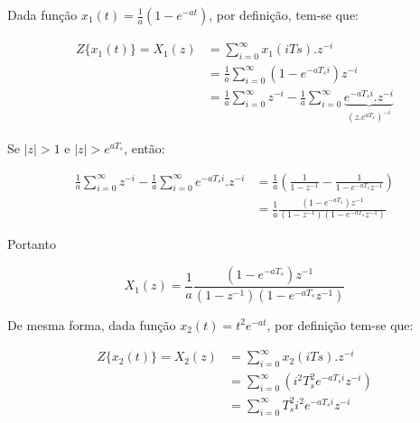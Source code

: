 \begin{enumerate}
        Dada função $x_1(t) = \frac{1}{a} \left( 1 - e^{-at} \right)$, por definição, tem-se que:
        
        	\begin{equation}
            	\begin{split}
                	Z\{x_1(t)\} = X_1(z) & = \sum_{i=0}^{\infty} x_1(i Ts).z^{-i} \\
                	& = \frac{1}{a} \sum_{i=0}^{\infty} \left( 1 - e^{-a T_s i} \right)z^{-i} \\
                	& = \frac{1}{a} \sum_{i=0}^{\infty} z^{-i} - \frac{1}{a} \sum_{i=0}^{\infty} \underbrace{e^{-a T_s i}.z^{-i}}_{(z.e^{aT_s})^{-i}}
            	\end{split}
        	\end{equation}
        
        Se $|z| > 1$ e $|z| > e^{aT_s}$, então:
        	
        	\begin{equation}
            	\begin{split}
                	\frac{1}{a} \sum_{i=0}^{\infty} z^{-i} - \frac{1}{a} \sum_{i=0}^{\infty} e^{-a T_s i}.z^{-i} & = \frac{1}{a} (\frac{1}{1-z^ {-1}} - \frac{1}{1-e^{-aT_s} z^ {-1}}) \\
                	& = \frac{1}{a} \frac{(1 - e^{-aT_s})z^{-1}}{(1-z^{-1})(1-e^{-aT_s} z^ {-1})}
            	\end{split}
        	\end{equation}
        	
        Portanto
        	
        	\begin{equation}
            	X_1(z) = \frac{1}{a}  \frac{(1 - e^{-aT_s})z^{-1}}{(1-z^{-1})(1-e^{-aT_s} z^ {-1})}
        	\end{equation}
        
        De mesma forma, dada função $x_2(t) = t^2 e^{-a t}$, por definição tem-se que:
        
        	\begin{equation}
            	\begin{split}
                	Z\{x_2(t)\} = X_2(z) & = \sum_{i=0}^{\infty} x_2(i Ts).z^{-i} \\
                	& = \sum_{i=0}^{\infty} \left( i^2 T_s^2 e^{-a T_s i} z^{-i} \right) \\
                	& = \sum_{i=0}^{\infty} T_s^2 i^2 e^{-a T_s i} z^{-i}
            	\end{split}
        	\end{equation}
        	

\end{enumerate}
